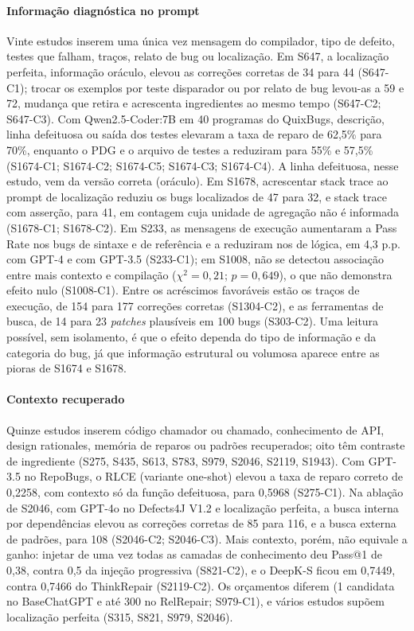 \paragraph{Informação diagnóstica no prompt}
Vinte estudos inserem uma única vez mensagem do compilador, tipo de defeito, testes que falham, traços, relato de bug ou localização.
Em S647, a localização perfeita, informação oráculo, elevou as correções corretas de 34 para 44 (S647-C1); trocar os exemplos por teste disparador ou por relato de bug levou-as a 59 e 72, mudança que retira e acrescenta ingredientes ao mesmo tempo (S647-C2; S647-C3).
Com Qwen2.5-Coder:7B em 40 programas do QuixBugs, descrição, linha defeituosa ou saída dos testes elevaram a taxa de reparo de 62,5\% para 70\%, enquanto o PDG e o arquivo de testes a reduziram para 55\% e 57,5\% (S1674-C1; S1674-C2; S1674-C5; S1674-C3; S1674-C4).
A linha defeituosa, nesse estudo, vem da versão correta (oráculo).
Em S1678, acrescentar stack trace ao prompt de localização reduziu os bugs localizados de 47 para 32, e stack trace com asserção, para 41, em contagem cuja unidade de agregação não é informada (S1678-C1; S1678-C2).
Em S233, as mensagens de execução aumentaram a Pass Rate nos bugs de sintaxe e de referência e a reduziram nos de lógica, em 4,3 p.p. com GPT-4 e com GPT-3.5 (S233-C1); em S1008, não se detectou associação entre mais contexto e compilação ($\chi^2 = 0{,}21$; $p = 0{,}649$), o que não demonstra efeito nulo (S1008-C1).
Entre os acréscimos favoráveis estão os traços de execução, de 154 para 177 correções corretas (S1304-C2), e as ferramentas de busca, de 14 para 23 \textit{patches} plausíveis em 100 bugs (S303-C2).
Uma leitura possível, sem isolamento, é que o efeito dependa do tipo de informação e da categoria do bug, já que informação estrutural ou volumosa aparece entre as pioras de S1674 e S1678.

\paragraph{Contexto recuperado}
Quinze estudos inserem código chamador ou chamado, conhecimento de API, design rationales, memória de reparos ou padrões recuperados; oito têm contraste de ingrediente (S275, S435, S613, S783, S979, S2046, S2119, S1943).
Com GPT-3.5 no RepoBugs, o RLCE (variante one-shot) elevou a taxa de reparo correto de 0,2258, com contexto só da função defeituosa, para 0,5968 (S275-C1).
Na ablação de S2046, com GPT-4o no Defects4J V1.2 e localização perfeita, a busca interna por dependências elevou as correções corretas de 85 para 116, e a busca externa de padrões, para 108 (S2046-C2; S2046-C3).
Mais contexto, porém, não equivale a ganho: injetar de uma vez todas as camadas de conhecimento deu Pass@1 de 0,38, contra 0,5 da injeção progressiva (S821-C2), e o DeepK-S ficou em 0,7449, contra 0,7466 do ThinkRepair (S2119-C2).
Os orçamentos diferem (1 candidata no BaseChatGPT e até 300 no RelRepair; S979-C1), e vários estudos supõem localização perfeita (S315, S821, S979, S2046).

